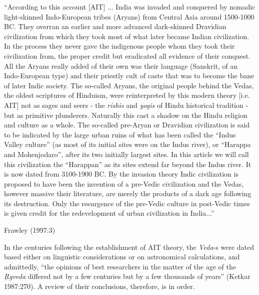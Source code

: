 \begin{myquote}
“According to this account [AIT] ... India was invaded and conquered by nomadic light-skinned Indo-European tribes (Aryans) from Central Asia around 1500-1000 BC. They overran an earlier and more advanced dark-skinned Dravidian civilization from which they took most of what later became Indian civilization. In the process they never gave the indigenous people whom they took their civilization from, the proper credit but eradicated all evidence of their conquest. All the Aryans really added of their own was their language (Sanskrit, of an Indo-European type) and their priestly cult of caste that was to become the bane of later Indic society. The so-called Aryans, the original people behind the Vedas, the oldest scriptures of Hinduism, were reinterpreted by this modern theory [i.e. AIT] not as sages and seers - the {\sl rishis} and {\sl yogis} of Hindu historical tradition - but as primitive plunderers. Naturally this cast a shadow on the Hindu religion and culture as a whole. The so-called pre-Aryan or Dravidian civilization is said to be indicated by the large urban ruins of what has been called the “Indus Valley culture” (as most of its initial sites were on the Indus river), or “Harappa and Mohenjodaro”, after its two initially largest sites. In this article we will call this civilization the “Harappan” as its sites extend far beyond the Indus river. It is now dated from 3100-1900 BC. By the invasion theory Indic civilization is proposed to have been the invention of a pre-Vedic civilization and the Vedas, however massive their literature, are merely the products of a dark age following its destruction. Only the resurgence of the pre-Vedic culture in post-Vedic times is given credit for the redevelopment of urban civilization in India...”

\hfill Frawley (1997:3)
\end{myquote}

In the centuries following the establishment of AIT theory, the {\sl Veda}-s were dated based either on linguistic considerations or on astronomical calculations, and admittedly, “the opinions of best researchers in the matter of the age of the {\sl Ṛgveda} differed not by a few centuries but by a few thousands of years” (Ketkar 1987:270). A review of their conclusions, therefore, is in order. 

